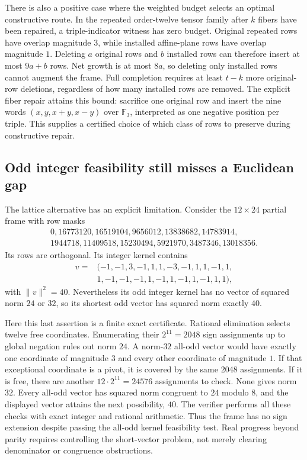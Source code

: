 There is also a positive case where the weighted budget selects an
optimal constructive route. In the repeated order-twelve tensor
family after $k$ fibers have been repaired, a triple-indicator
witness has zero budget. Original repeated rows have overlap
magnitude $3$, while installed affine-plane rows have overlap
magnitude $1$. Deleting $a$ original rows and $b$ installed rows
can therefore insert at most $9a+b$ rows. Net growth is at most
$8a$, so deleting only installed rows cannot augment the frame.
Full completion requires at least $t-k$ more original-row deletions,
regardless of how many installed rows are removed. The explicit fiber
repair attains this bound: sacrifice one original row and insert the
nine words $(x,y,x+y,x-y)$ over $\mathbb F_3$, interpreted as one
negative position per triple. This supplies a certified choice of
which class of rows to preserve during constructive repair.

\subsection{Odd integer feasibility still misses a Euclidean gap}
The lattice alternative has an explicit limitation. Consider the
$12\times24$ partial frame with row masks
\[
\begin{gathered}
0,16773120,16519104,9656012,13838682,14783914,\\
1944718,11409518,15230494,5921970,3487346,13018356.
\end{gathered}
\]
Its rows are orthogonal. Its integer kernel contains
\[
\begin{split}
v={}&(-1,-1,3,-1,1,1,-3,-1,1,1,-1,1,\\
&1,-1,-1,-1,1,-1,1,-1,1,-1,1,1),
\end{split}
\]
with $\|v\|^2=40$. Nevertheless its odd integer kernel has no vector
of squared norm $24$ or $32$, so its shortest odd vector has squared
norm exactly $40$.

Here this last assertion is a finite exact certificate. Rational
elimination selects twelve free coordinates. Enumerating their
$2^{11}=2048$ sign assignments up to global negation rules out norm
$24$. A norm-$32$ all-odd vector would have exactly one coordinate
of magnitude $3$ and every other coordinate of magnitude $1$.
If that exceptional coordinate is a pivot, it is covered by the same
2048 assignments. If it is free, there are another
$12\cdot2^{11}=24576$ assignments to check. None gives norm $32$.
Every all-odd vector has squared norm congruent to $24$ modulo $8$,
and the displayed vector attains the next possibility, $40$.
The verifier performs all these checks with exact integer and rational
arithmetic. Thus the frame has no sign extension despite passing the
all-odd kernel feasibility test. Real progress beyond parity requires
controlling the short-vector problem, not merely clearing denominator
or congruence obstructions.

